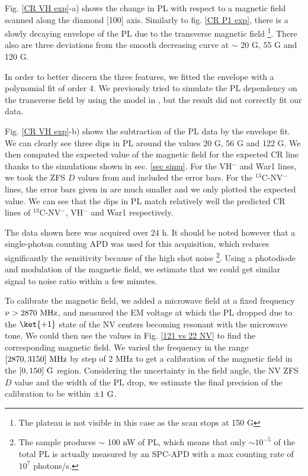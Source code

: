\documentclass[a4paper, 11pt]{report}
\begin{document}
Fig. \ref{CR VH exp}-a) shows the change in PL with respect to a magnetic field scanned along the diamond [100] axis. Similarly to fig. \ref{CR P1 exp}, there is a slowly decaying envelope of the PL due to the transverse magnetic field \footnote{The plateau is not visible in this case as the scan stops at 150 G}. There also are three deviations from the smooth decreasing curve at $\sim$ 20 G, 55 G and 120 G.

In order to better discern the three features, we fitted the envelope with a polynomial fit of order 4. We previously tried to simulate the PL dependency on the transverse field  by using the model in \citep{tetienne2012magnetic}, but the result did not correctly fit our data.

Fig. \ref{CR VH exp}-b) shows the subtraction of the PL data by the envelope fit. We can clearly see three dips in PL around the values 20 G, 56 G and 122 G. We then computed the expected value of the magnetic field for the expected CR line thanks to the simulations shown in sec. \ref{sec simu}. For the VH$^-$ and War1 lines, we took the ZFS $D$ values from \citep{cruddace2007magnetic} and included the error bars. For the $^{13}$C-NV$^-$ lines, the error bars given in \citep{simanovskaia2013sidebands} are much smaller and we only plotted the expected value. We can see that the dips in PL match relatively well the predicted CR lines of $^{13}$C-NV$^-$, VH$^-$ and War1 respectively.

The data shown here was acquired over 24 h. It should be noted however that a single-photon counting APD was used for this acquisition, which reduces significantly the sensitivity because of the high shot noise \footnote{The sample produces $\sim$ 100 nW of PL, which means that only $\sim 10^{-5}$ of the total PL is actually measured by an SPC-APD with a max counting rate of $10^7$ photons/s.}. Using a photodiode and modulation of the magnetic field, we estimate that we could get similar signal to noise ratio within a few minutes.

To calibrate the magnetic field, we added a microwave field at a  fixed frequency $\nu > 2870\ \rm MHz$, and measured the EM voltage at which the PL dropped due to the $\ket{+1}$ state of the NV centers becoming resonant with the microwave tone. We could then use the values in Fig. \ref{121 vs 22 NV} to find the corresponding magnetic field. We varied the frequency in the range  $[2870,3150]\ \rm MHz$ by step of 2 MHz to get a calibration of the magnetic field in the $[0,150]\ \rm G$ region. Considering the uncertainty in the field angle, the NV ZFS $D$ value and the width of the PL drop, we estimate the final precision of the calibration to be within $\pm 1\ \rm G$.
\end{document}
